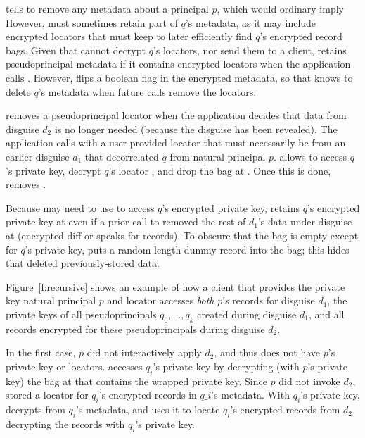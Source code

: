 %
 tells \sys to remove any metadata about a principal
$p$, which would ordinary imply
%
However, \sys must sometimes retain part of $q$'s metadata, as it may include
encrypted locators that \sys must keep to later efficiently find $q$'s
encrypted record bags.
%
Given that \sys cannot decrypt $q$'s locators, nor send them to a
client, \sys retains pseudoprincipal metadata if it contains encrypted locators
when the application calls .
%
However, \sys flips a boolean flag in the encrypted metadata, so that \sys
knows to delete $q$'s metadata when future  calls remove
the locators.
%

%
\sys removes a pseudoprincipal locator  when the application
decides that data from disguise $d_2$ is no longer needed (\eg because
the disguise has been revealed).
%
The application calls  with a
user-provided locator that must necessarily be from an earlier disguise
$d_1$ that decorrelated $q$ from natural principal $p$.
%
 allows \sys to access $q$'s private key, decrypt $q$'s locator
, and drop the bag at .
%
Once this is done, \sys removes .
%

%
Because \sys may need to use  to access $q$'s encrypted private key,
\sys retains $q$'s encrypted private key at  even if a prior call to
 removed the rest of $d_1$'s data under
disguise at  (\ie encrypted diff or speaks-for records).
%
To obscure that the bag is empty except for $q$'s private key,
\sys puts a random-length dummy record into the bag; this hides that \sys
deleted previously-stored data.
%
%

%
Figure~\ref{f:recursive} shows an example of how a client that provides
the private key natural principal $p$ and locator  accesses
\emph{both} $p$'s records for disguise $d_1$, the private
keys of all pseudoprincipals ${q_0, \dots, q_k}$ created during disguise
$d_1$, and all records encrypted for these pseudoprincipals during disguise
$d_2$.

%
In the first case, $p$ did not interactively apply $d_2$, and thus \sys does not have $p$'s private
key or locators.
\sys accesses $q_i$'s private key by decrypting (with $p$'s private key) the
bag at  that contains the wrapped private key.
Since $p$ did not invoke $d_2$, \sys stored a locator for $q_i$'s encrypted records
 in $q\_i$'s metadata.
With $q_i$'s private key, \sys decrypts  from $q_i$'s metadata,
and uses it to locate $q_i$'s encrypted records from $d_2$, decrypting the records
with $q_i$'s private key.
%

